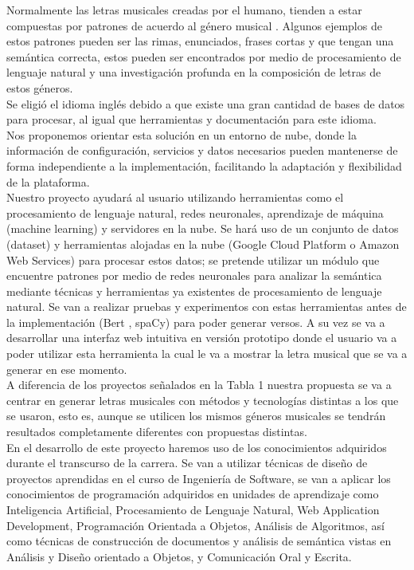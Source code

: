 \documentclass[12pt, a4paper, titlepage]{report}
\begin{document}
    	Normalmente las letras musicales creadas por el humano, tienden a estar compuestas por patrones de acuerdo al género musical \cite{genero_musical_en_la_musica_popular}. Algunos ejemplos de estos patrones pueden ser las rimas, enunciados, frases cortas y que tengan una semántica correcta, estos pueden ser encontrados por medio de procesamiento de lenguaje natural y una investigación profunda en la composición de letras de estos géneros.\\
    	
    	Se eligió el idioma inglés debido a que existe una gran cantidad de bases de datos para procesar, al igual que herramientas y documentación para este idioma.\\
    	
    	Nos proponemos orientar esta solución en un entorno de nube, donde la información de configuración, servicios y datos necesarios pueden mantenerse de forma independiente a la implementación, facilitando la adaptación y flexibilidad de la plataforma.\\
    	
    	Nuestro proyecto ayudará al usuario utilizando herramientas como el procesamiento de lenguaje natural, redes neuronales, aprendizaje de máquina (machine learning) y servidores en la nube. Se hará uso de un conjunto de datos (dataset) y herramientas alojadas en la nube (Google Cloud Platform o Amazon Web Services) para procesar estos datos; se pretende utilizar un módulo que encuentre patrones por medio de redes neuronales para analizar la semántica mediante técnicas y herramientas ya existentes de procesamiento de lenguaje natural. Se van a realizar pruebas y experimentos con estas herramientas antes de la implementación (Bert \cite{Bert}, spaCy\cite{spaCy}) para poder generar versos. A su vez se va a desarrollar una interfaz web intuitiva en versión prototipo donde el usuario va a poder utilizar esta herramienta la cual le va a mostrar la letra musical que se va a generar en ese momento.\\
    	
    	A diferencia de los proyectos señalados en la Tabla 1 nuestra propuesta se va a centrar en generar letras musicales con métodos y tecnologías distintas a los que se usaron, esto es, aunque se utilicen los mismos géneros musicales se tendrán resultados completamente diferentes con propuestas distintas.\\
    	
    	En el desarrollo de este proyecto haremos uso de los conocimientos adquiridos durante el transcurso de la carrera. Se van a utilizar técnicas de diseño de proyectos aprendidas en el curso de Ingeniería de Software, se van a aplicar los conocimientos de programación adquiridos en unidades de aprendizaje como Inteligencia Artificial, Procesamiento de Lenguaje Natural, Web Application Development, Programación Orientada a Objetos, Análisis de Algoritmos, así como técnicas de construcción de documentos y análisis de semántica vistas en Análisis y Diseño orientado a Objetos, y Comunicación Oral y Escrita.
    	
\end{document}
